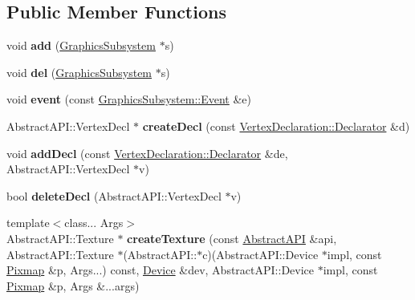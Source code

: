 \subsection*{Public Member Functions}
\begin{DoxyCompactItemize}
\item 
\hypertarget{struct_device_1_1_data_aa2b8aac2435adca7aba3479a31346cc3}{void {\bfseries add} (\hyperlink{class_tempest_1_1_graphics_subsystem}{Graphics\+Subsystem} $\ast$s)}\label{struct_device_1_1_data_aa2b8aac2435adca7aba3479a31346cc3}

\item 
\hypertarget{struct_device_1_1_data_a46741e251155850df4cc591bcda2d619}{void {\bfseries del} (\hyperlink{class_tempest_1_1_graphics_subsystem}{Graphics\+Subsystem} $\ast$s)}\label{struct_device_1_1_data_a46741e251155850df4cc591bcda2d619}

\item 
\hypertarget{struct_device_1_1_data_a1002fd08301ce54d08a823c1357ae1f8}{void {\bfseries event} (const \hyperlink{struct_tempest_1_1_graphics_subsystem_1_1_event}{Graphics\+Subsystem\+::\+Event} \&e)}\label{struct_device_1_1_data_a1002fd08301ce54d08a823c1357ae1f8}

\item 
\hypertarget{struct_device_1_1_data_a324746ed2d5cc66d8e673668f443ab15}{Abstract\+A\+P\+I\+::\+Vertex\+Decl $\ast$ {\bfseries create\+Decl} (const \hyperlink{class_tempest_1_1_vertex_declaration_1_1_declarator}{Vertex\+Declaration\+::\+Declarator} \&d)}\label{struct_device_1_1_data_a324746ed2d5cc66d8e673668f443ab15}

\item 
\hypertarget{struct_device_1_1_data_ab717aec0d0f630f88222a16f1bc7937f}{void {\bfseries add\+Decl} (const \hyperlink{class_tempest_1_1_vertex_declaration_1_1_declarator}{Vertex\+Declaration\+::\+Declarator} \&de, Abstract\+A\+P\+I\+::\+Vertex\+Decl $\ast$v)}\label{struct_device_1_1_data_ab717aec0d0f630f88222a16f1bc7937f}

\item 
\hypertarget{struct_device_1_1_data_a25d5564599bce447177d95889c814f3b}{bool {\bfseries delete\+Decl} (Abstract\+A\+P\+I\+::\+Vertex\+Decl $\ast$v)}\label{struct_device_1_1_data_a25d5564599bce447177d95889c814f3b}

\item 
\hypertarget{struct_device_1_1_data_ae8a75b07129d898605c4687f74aa28cd}{{\footnotesize template$<$class... Args$>$ }\\Abstract\+A\+P\+I\+::\+Texture $\ast$ {\bfseries create\+Texture} (const \hyperlink{class_tempest_1_1_abstract_a_p_i}{Abstract\+A\+P\+I} \&api, Abstract\+A\+P\+I\+::\+Texture $\ast$(Abstract\+A\+P\+I\+::$\ast$c)(Abstract\+A\+P\+I\+::\+Device $\ast$impl, const \hyperlink{class_tempest_1_1_pixmap}{Pixmap} \&p, Args...) const, \hyperlink{class_tempest_1_1_device}{Device} \&dev, Abstract\+A\+P\+I\+::\+Device $\ast$impl, const \hyperlink{class_tempest_1_1_pixmap}{Pixmap} \&p, Args \&...args)}\label{struct_device_1_1_data_ae8a75b07129d898605c4687f74aa28cd}

\end{DoxyCompactItemize}
